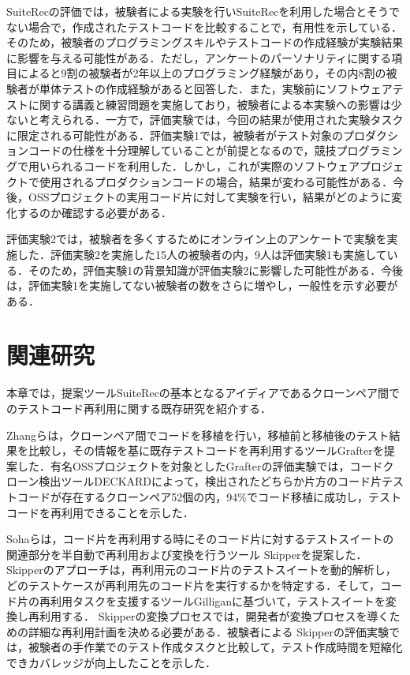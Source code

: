 \documentclass[12pt]{jarticle} %
\begin{document}
{\sf SuiteRec}の評価では，被験者による実験を行い{\sf SuiteRec}を利用した場合とそうでない場合で，作成されたテストコードを比較することで，有用性を示している．そのため，被験者のプログラミングスキルやテストコードの作成経験が実験結果に影響を与える可能性がある．ただし，アンケートのパーソナリティに関する項目によると9割の被験者が2年以上のプログラミング経験があり，その内8割の被験者が単体テストの作成経験があると回答した．また，実験前にソフトウェアテストに関する講義と練習問題を実施しており，被験者による本実験への影響は少ないと考えられる．一方で，評価実験では，今回の結果が使用された実験タスクに限定される可能性がある．評価実験1では，被験者がテスト対象のプロダクションコードの仕様を十分理解していることが前提となるので，競技プログラミングで用いられるコードを利用した．しかし，これが実際のソフトウェアプロジェクトで使用されるプロダクションコードの場合，結果が変わる可能性がある．今後，OSSプロジェクトの実用コード片に対して実験を行い，結果がどのように変化するのか確認する必要がある．

評価実験2では，被験者を多くするためにオンライン上のアンケートで実験を実施した．評価実験2を実施した15人の被験者の内，9人は評価実験1も実施している．そのため，評価実験1の背景知識が評価実験2に影響した可能性がある．今後は，評価実験1を実施してない被験者の数をさらに増やし，一般性を示す必要がある．




\newpage
\section{関連研究}
本章では，提案ツール{\sf SuiteRec}の基本となるアイディアであるクローンペア間でのテストコード再利用に関する既存研究を紹介する．

Zhangら\cite{Zhang2017}は，クローンペア間でコードを移植を行い，移植前と移植後のテスト結果を比較し，その情報を基に既存テストコードを再利用するツール{\sf Grafter}を提案した．有名OSSプロジェクトを対象とした{\sf Grafter}の評価実験では，コードクローン検出ツール{\sf DECKARD}\cite{Jiang2007}によって，検出されたどちらか片方のコード片テストコードが存在するクローンペア52個の内，94\%でコード移植に成功し，テストコードを再利用できることを示した．

Sohaら\cite{skipper}は，コード片を再利用する時にそのコード片に対するテストスイートの関連部分を半自動で再利用および変換を行うツール{ \sf Skipper}を提案した．{ \sf Skipper}のアプローチは，再利用元のコード片のテストスイートを動的解析し，どのテストケースが再利用先のコード片を実行するかを特定する．そして，コード片の再利用タスクを支援するツール{\sf Gilligan}\cite{gilligan10,gilligan34}に基づいて，テストスイートを変換し再利用する．{ \sf Skipper}の変換プロセスでは，開発者が変換プロセスを導くための詳細な再利用計画を決める必要がある．被験者による{ \sf Skipper}の評価実験では，被験者の手作業でのテスト作成タスクと比較して，テスト作成時間を短縮化できカバレッジが向上したことを示した．
\end{document}
